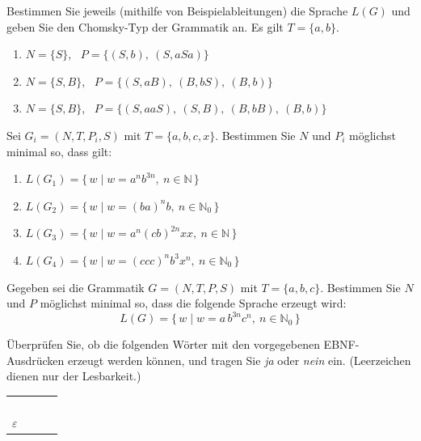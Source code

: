 \aufgaben
{}
Bestimmen Sie jeweils (mithilfe von Beispielableitungen) die Sprache $L(G)$ und geben Sie den Chomsky-Typ der Grammatik an. Es gilt $T = \{a, b\}$.
\begin{enumerate}[label=\alph*)]
\item $N = \{S\}$, \ $P = \{(S, b),\ (S, aSa)\}$
\item $N = \{S, B\}$, \ $P = \{(S, aB),\ (B, bS),\ (B, b)\}$
\item $N = \{S, B\}$, \ $P = \{(S, aaS),\ (S, B),\ (B, bB),\ (B, b)\}$
\end{enumerate}

Sei $G_i = (N, T, P_i, S)$ mit $T = \{a, b, c, x\}$. Bestimmen Sie $N$ und $P_i$ möglichst minimal so, dass gilt:
\begin{enumerate}[label=\alph*)]
\item $L(G_1) = \{\, w \mid w = a^{n} b^{3n},\ n \in \mathbb{N} \,\}$
\item $L(G_2) = \{\, w \mid w = (ba)^{n} b,\ n \in \mathbb{N}_0 \,\}$
\item $L(G_3) = \{\, w \mid w = a^{n} (cb)^{2n} xx,\ n \in \mathbb{N} \,\}$
\item $L(G_4) = \{\, w \mid w = (ccc)^{n} b^3 x^n,\ n \in \mathbb{N}_0 \,\}$
\end{enumerate}

Gegeben sei die Grammatik $G = (N, T, P, S)$ mit $T = \{a, b, c\}$. Bestimmen Sie $N$ und $P$ möglichst minimal so, dass die folgende Sprache erzeugt wird:
\[
L(G) = \{\, w \mid w = a\,b^{3n} c^{n},\ n \in \mathbb{N}_0 \,\}
\]

Überprüfen Sie, ob die folgenden Wörter mit den vorgegebenen EBNF-Ausdrücken erzeugt werden können, und tragen Sie \emph{ja} oder \emph{nein} ein. (Leerzeichen dienen nur der Lesbarkeit.)
\begin{center}
\renewcommand{\arraystretch}{1.5}
\begin{tabular}{|l|C{2.8cm}|C{2.8cm}|C{2.8cm}|}
\hline
 &  &  &  \\ \hline
{} & & & \\ \hline
{} & & & \\ \hline
{} & & & \\ \hline
{} & & & \\ \hline
$\varepsilon$ & & & \\ \hline
\end{tabular}
\end{center}

